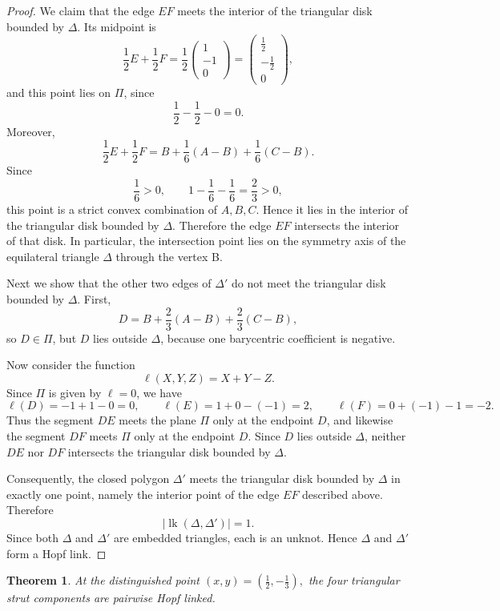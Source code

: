\documentclass[12pt]{article}
\newtheorem{thm}{Theorem}
\begin{document}
\begin{proof}
We claim that the edge \(EF\) meets the interior of the triangular disk bounded by \(\Delta\).
Its midpoint is
\[
\frac12E+\frac12F
=
\frac12
\begin{pmatrix}
1\\ -1\\ 0
\end{pmatrix}
=
\begin{pmatrix}
\frac12\\ -\frac12\\ 0
\end{pmatrix},
\]
and this point lies on \(\Pi\), since
\[
\frac12-\frac12-0=0.
\]
Moreover,
\[
\frac12E+\frac12F
=
B+\frac16(A-B)+\frac16(C-B).
\]
Since
\[
\frac16>0,\qquad
1-\frac16-\frac16=\frac23>0,
\]
this point is a strict convex combination of \(A,B,C\). Hence it lies in the interior of the triangular disk bounded by \(\Delta\). Therefore the edge \(EF\) intersects the interior of that disk.
In particular, the intersection point lies on the symmetry axis of the equilateral triangle 
$\Delta$ through the vertex B.

Next we show that the other two edges of \(\Delta'\) do not meet the triangular disk bounded by \(\Delta\).
First,
\[
D = B + \frac23(A-B) +\frac23(C-B),
\]
so \(D\in \Pi\), but \(D\) lies outside \(\Delta\), because one barycentric coefficient is negative.

Now consider the function
\[
\ell(X,Y,Z)=X+Y-Z.
\]
Since \(\Pi\) is given by \(\ell=0\), we have
\[
\ell(D)= -1+1-0=0,\qquad
\ell(E)=1+0-(-1)=2,\qquad
\ell(F)=0+(-1)-1=-2.
\]
Thus the segment \(DE\) meets the plane \(\Pi\) only at the endpoint \(D\), and likewise the segment \(DF\) meets \(\Pi\) only at the endpoint \(D\). Since \(D\) lies outside \(\Delta\), neither \(DE\) nor \(DF\) intersects the triangular disk bounded by \(\Delta\).

Consequently, the closed polygon \(\Delta'\) meets the triangular disk bounded by \(\Delta\) in exactly one point, namely the interior point of the edge \(EF\) described above. Therefore
\[
\bigl|\operatorname{lk}(\Delta,\Delta')\bigr|=1.
\]
Since both \(\Delta\) and \(\Delta'\) are embedded triangles, each is an unknot. Hence \(\Delta\) and \(\Delta'\) form a Hopf link.
\end{proof}


\begin{thm}
At the distinguished point
$
(x,y)=\left(\frac12,-\frac13\right),
$
the four triangular strut components are pairwise Hopf linked.
\end{thm}
\end{document}
